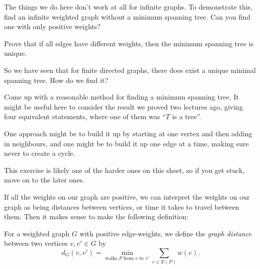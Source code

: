 \documentclass[nobib]{tufte-handout}
\begin{document}
\begin{xca}
    The things we do here don't work at all for infinite graphs. To demonstrate this, find an infinite weighted graph without a minimum spanning tree. Can you find one with only positive weights?
\end{xca}

\begin{xca}
    Prove that if all edges have different weights, then the minimum spanning tree is unique.
\end{xca}

So we have seen that for finite directed graphs, there does exist a unique minimal spanning tree. How do we find it?

\begin{xca}
  Come up with a reasonable method for finding a minimum spanning tree. It might be useful here to consider the result we proved two lectures ago, giving four equivalent statements, where one of them was ``$T$ is a tree''.

  One approach might be to build it up by starting at one vertex and then adding in neighbours, and one might be to build it up one edge at a time, making sure never to create a cycle.

  This exercise is likely one of the harder ones on this sheet, so if you get stuck, move on to the later ones.
\end{xca}

If all the weights on our graph are positive, we can interpret the weights on our graph as being distances between vertices, or time it takes to travel between them. Then it makes sense to make the following definition:

\begin{definition}
  For a weighted graph $G$ with positive edge-weights, we define the \emph{graph distance} between two vertices $v, v' \in G$ by
  $$d_G(v, v') = \min_{\text{walks }P\text{ from }v\text{ to }v'} \sum_{e \in E(P)} w(e).$$
\end{definition}
\end{document}
